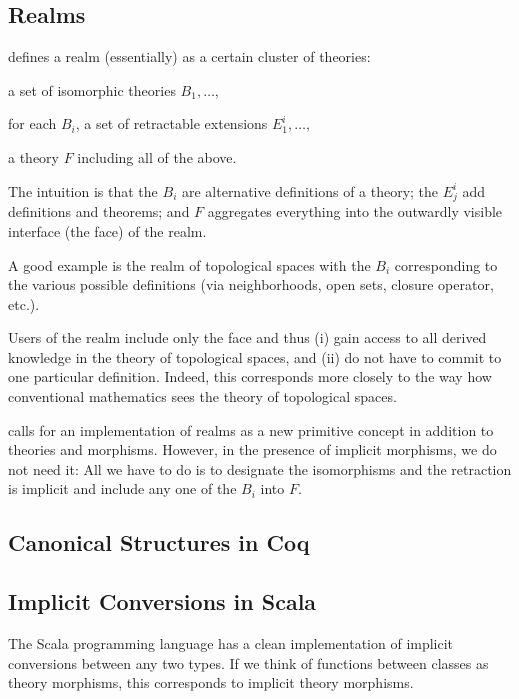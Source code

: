 \subsection{Realms}

\cite{realms} defines a realm (essentially) as a certain cluster of theories:
\begin{compactitem}
\item a set of isomorphic theories $B_1,\ldots,$
\item for each $B_i$, a set of retractable extensions $E^i_1,\ldots,$
\item a theory $F$ including all of the above.
\end{compactitem}
The intuition is that the $B_i$ are alternative definitions of a theory; the $E^i_j$ add definitions and theorems; and $F$ aggregates everything into the outwardly visible interface (the face) of the realm.

A good example is the realm of topological spaces with the $B_i$ corresponding to the various possible definitions (via neighborhoods, open sets, closure operator, etc.).

Users of the realm include only the face and thus (i) gain access to all derived knowledge in the theory of topological spaces, and (ii) do not have to commit to one particular definition.
Indeed, this corresponds more closely to the way how conventional mathematics sees the theory of topological spaces.

\cite{realms} calls for an implementation of realms as a new primitive concept in addition to theories and morphisms.
However, in the presence of implicit morphisms, we do not need it: All we have to do is to designate the isomorphisms and the retraction is implicit and include any one of the $B_i$ into $F$.


\subsection{Canonical Structures in Coq}

\cite{gonthier_packaging}


\subsection{Implicit Conversions in Scala}

The Scala programming language \cite{scala} has a clean implementation of implicit conversions between any two types.
If we think of functions between classes as theory morphisms, this corresponds to implicit theory morphisms.

